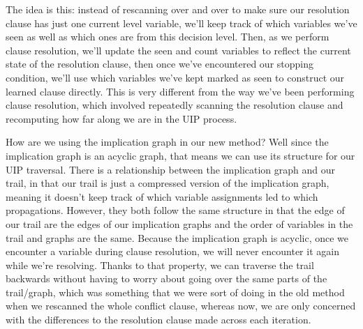 \documentclass[oneside]{book}
\begin{document}
The idea is this: instead of rescanning over and over to make sure our resolution clause
has just one current level variable, we'll keep track of which variables we've seen as 
well as which ones are from this decision level. Then, as we perform clause resolution, 
we'll update the seen and count variables to reflect the current state of the resolution 
clause, then once we've encountered our stopping condition, we'll use which variables 
we've kept marked as seen to construct our learned clause directly. This is very different 
from the way we've been performing clause resolution, which involved repeatedly scanning the 
resolution clause and recomputing how far along we are in the UIP process. 

How are we using the implication graph in our new method? Well since the implication 
graph is an acyclic graph, that means we can use its structure for our UIP traversal. 
There is a relationship between the implication graph and our trail, in that our trail 
is just a compressed version of the implication graph, meaning it doesn't keep track of 
which variable assignments led to which propagations. However, they both follow the same 
structure in that the edge of our trail are the edges of our implication graphs and the 
order of variables in the trail and graphs are the same. Because the implication graph 
is acyclic, once we encounter a variable during clause resolution, we will never encounter 
it again while we're resolving. Thanks to that property, we can traverse the trail backwards 
without having to worry about going over the same parts of the trail/graph, which was 
something that we were sort of doing in the old method when we rescanned the whole 
conflict clause, whereas now, we are only concerned with the differences to the resolution
clause made across each iteration. 
\end{document}
